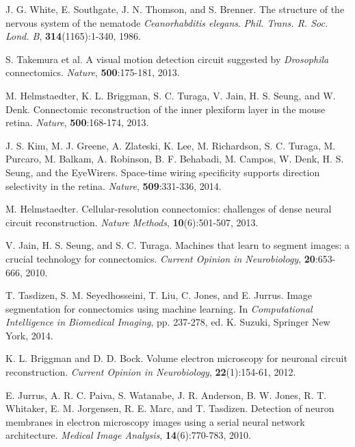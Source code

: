 \documentclass{article} %
\begin{document}
\begingroup
\renewcommand{\section}[2]{}
\begin{thebibliography}{9}
\small{

J. G. White, E. Southgate, J. N. Thomson, and S. Brenner. The structure of the nervous system of the nematode {\it Ceanorhabditis elegans}. {\it Phil. Trans. R. Soc. Lond. B}, {\bf 314}(1165):1-340, 1986.

S. Takemura et al. A visual motion detection circuit suggested by {\it Drosophila} connectomics. {\it Nature}, {\bf 500}:175-181, 2013.

M. Helmstaedter, K. L. Briggman, S. C. Turaga, V. Jain, H. S. Seung, and W. Denk. Connectomic reconstruction of the inner plexiform layer in the mouse retina. {\it Nature}, {\bf 500}:168-174, 2013.

J. S. Kim, M. J. Greene, A. Zlateski, K. Lee, M. Richardson, S. C. Turaga, M. Purcaro, M. Balkam, A. Robinson, B. F. Behabadi, M. Campos, W. Denk, H. S. Seung, and the EyeWirers. Space-time wiring specificity supports direction selectivity in the retina. {\it Nature}, {\bf 509}:331-336, 2014.

M. Helmstaedter. Cellular-resolution connectomics: challenges of dense neural circuit reconstruction. {\it Nature Methods}, {\bf 10}(6):501-507, 2013.

V. Jain, H. S. Seung, and S. C. Turaga. Machines that learn to segment images: a crucial technology for connectomics. {\it Current Opinion in Neurobiology}, {\bf 20}:653-666, 2010.

T. Tasdizen, S. M. Seyedhosseini, T. Liu, C. Jones, and E. Jurrus. Image segmentation for connectomics using machine learning. In {\it Computational Intelligence in Biomedical Imaging}, pp. 237-278, ed. K. Suzuki, Springer New York, 2014.

K. L. Briggman and D. D. Bock. Volume electron microscopy for neuronal circuit reconstruction. {\it Current Opinion in Neurobiology}, {\bf 22}(1):154-61, 2012.

E. Jurrus, A. R. C. Paiva, S. Watanabe, J. R. Anderson, B. W. Jones, R. T. Whitaker, E. M. Jorgensen, R. E. Marc, and T. Tasdizen. Detection of neuron membranes in electron microscopy images using a serial neural network architecture. {\it Medical Image Analysis}, {\bf 14}(6):770-783, 2010.

}
\end{thebibliography}
\end{document}
